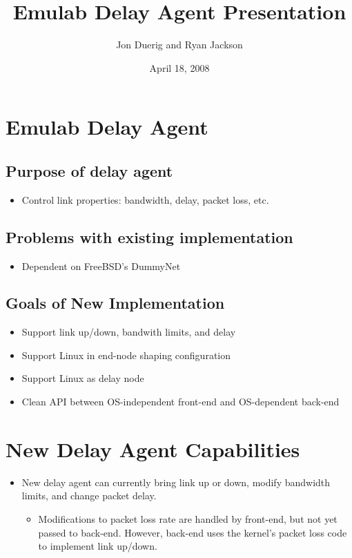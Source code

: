 \documentclass[12pt]{article}
\title{Emulab Delay Agent Presentation}			%
\author{Jon Duerig and Ryan Jackson }		%
\date{April 18, 2008}					%
\begin{document}
\maketitle						%
\section{Emulab Delay Agent}

\subsection{Purpose of delay agent}
\begin{itemize}
\item
Control link properties: bandwidth, delay, packet loss, etc.
\end{itemize}

\subsection{Problems with existing implementation}
\begin{itemize}
\item
Dependent on FreeBSD's DummyNet
\end{itemize}

\subsection{Goals of New Implementation}
\begin{itemize}
\item
Support link up/down, bandwith limits, and delay
\item
Support Linux in end-node shaping configuration
\item
Support Linux as delay node
\item
Clean API between OS-independent front-end and OS-dependent back-end
\end{itemize}

\section{New Delay Agent Capabilities}

\begin{itemize}
\item
New delay agent can currently bring link up or down, modify
bandwidth limits, and change packet delay.
\begin{itemize}
\item
Modifications to packet loss rate are handled by front-end, but
not yet passed to back-end.  However, back-end uses the kernel's
packet loss code to implement link up/down.
\end{itemize}
\end{itemize}
\end{document}
